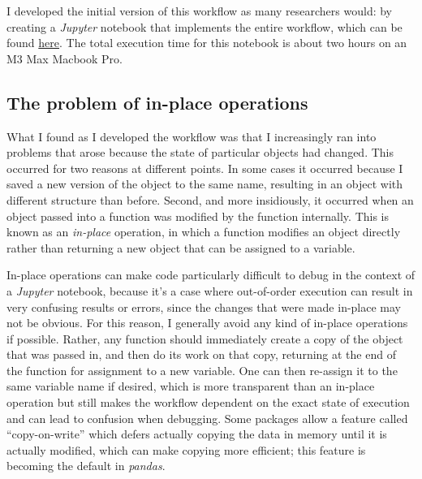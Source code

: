 I developed the initial version of this workflow as many researchers would: by creating a \textit{Jupyter} notebook that implements the entire workflow, which can be found \href{https://github.com/BetterCodeBetterScience/example-rnaseq/blob/main/notebooks/immune\_scrnaseq\_2\_preprocess.ipynb}{here}. The total execution time for this notebook is about two hours on an M3 Max Macbook Pro.

\subsection{The problem of in-place operations}

What I found as I developed the workflow was that I increasingly ran into problems that arose because the state of particular objects had changed.  This occurred for two reasons at different points.  In some cases it occurred because I saved a new version of the object to the same name, resulting in an object with different structure than before.  Second, and more insidiously, it occurred when an object passed into a function was modified by the function internally.  This is known as an \textit{in-place} operation, in which a function modifies an object directly rather than returning a new object that can be assigned to a variable.

In-place operations can make code particularly difficult to debug in the context of a \textit{Jupyter} notebook, because it's a case where out-of-order execution can result in very confusing results or errors, since the changes that were made in-place may not be obvious.  For this reason, I generally avoid any kind of in-place operations if possible.  Rather, any function should immediately create a copy of the object that was passed in, and then do its work on that copy, returning at the end of the function for assignment to a new variable.  One can then re-assign it to the same variable name if desired, which is more transparent than an in-place operation but still makes the workflow dependent on the exact state of execution and can lead to confusion when debugging.  Some packages allow a feature called ``copy-on-write'' which defers actually copying the data in memory until it is actually modified, which can make copying more efficient; this feature is becoming the default in \textit{pandas}.

